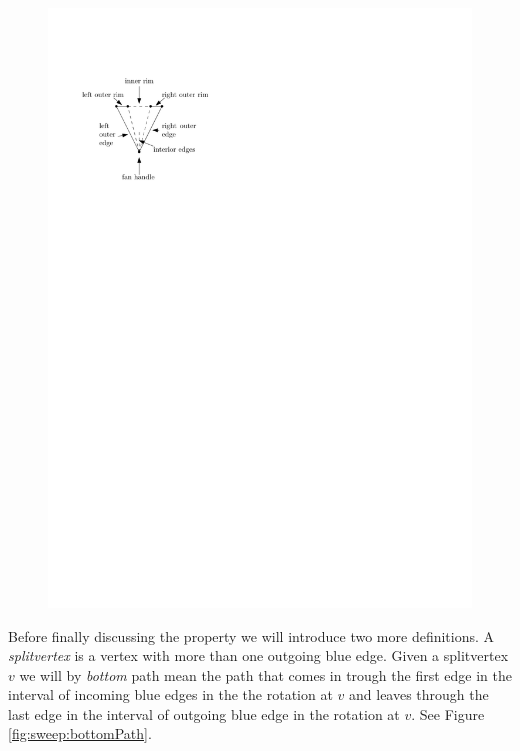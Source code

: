      \begin{figure}[h]
       \centering
       \includegraphics[scale=1]{rectangularDuals/img/fanterms}
       \caption{}
       \label{fig:rect:fanTerms}
     \end{figure}

    Before finally discussing the property we will introduce two more definitions.
    A \emph{splitvertex} is a vertex with more than one outgoing blue edge.
    Given a splitvertex $v$ we will by \emph{bottom} path mean the path that comes in trough the first edge in the interval of incoming blue edges in the the rotation at $v$ and leaves through the last edge in the interval of outgoing blue edge in the rotation at $v$.
    See Figure \ref{fig:sweep:bottomPath}.

